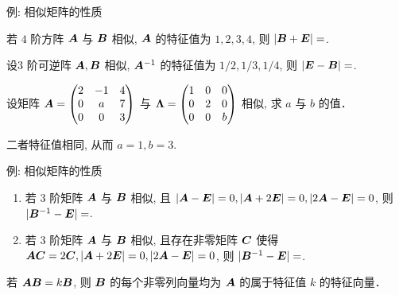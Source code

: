 \begin{frame}{例: 相似矩阵的性质}
	\onslide<+->
	\begin{example}
		若 $4$ 阶方阵 ${\boldsymbol{A}}$ 与 ${\boldsymbol{B}}$ 相似, ${\boldsymbol{A}}$ 的特征值为 $1,2,3,4$, 则 $|{\boldsymbol{B}}+{\boldsymbol{E}}|=$.
	\end{example}
	\onslide<+->
	\begin{example}
		设$3$ 阶可逆阵 ${\boldsymbol{A}},{\boldsymbol{B}}$ 相似, ${\boldsymbol{A}}^{-1}$ 的特征值为 $1/2,1/3,1/4$, 则 $|{\boldsymbol{E}}-{\boldsymbol{B}}|=$\fillblank{\visible<+->{$-6$}}.
	\end{example}
	\onslide<+->
	\begin{example}
		设矩阵 ${\boldsymbol{A}}=\begin{pmatrix}
			2&-1&4\\
			0&a&7\\
			0&0&3
		\end{pmatrix}$ 与 ${\boldsymbol{\Lambda}}=\begin{pmatrix}
			1&0&0\\
			0&2&0\\
			0&0&b
		\end{pmatrix}$ 相似, 求 $a$ 与 $b$ 的值．
	\end{example}
	\onslide<+->
	\begin{solution}
		二者特征值相同, 从而 $a=1,b=3$.
	\end{solution}
\end{frame}


\begin{frame}{例: 相似矩阵的性质}
	\onslide<+->
	\begin{exercise}
		\begin{enumerate}
			\item 若 $3$ 阶矩阵 ${\boldsymbol{A}}$ 与 ${\boldsymbol{B}}$ 相似, 且 $|{\boldsymbol{A}}-{\boldsymbol{E}}|=0, |{\boldsymbol{A}}+2{\boldsymbol{E}}|=0, |2{\boldsymbol{A}}-{\boldsymbol{E}}|=0$, 则 $|{\boldsymbol{B}}^{-1}-{\boldsymbol{E}}|=$\fillblank{\visible<4->{$3/4$}}.
			\item 若 $3$ 阶矩阵 ${\boldsymbol{A}}$ 与 ${\boldsymbol{B}}$ 相似, 且存在非零矩阵 ${\boldsymbol{C}}$ 使得 ${\boldsymbol{A}}{\boldsymbol{C}}=2{\boldsymbol{C}}, |{\boldsymbol{A}}+2{\boldsymbol{E}}|=0, |2{\boldsymbol{A}}-{\boldsymbol{E}}|=0$, 则 $|{\boldsymbol{B}}^{-1}-{\boldsymbol{E}}|=$\fillblank{\visible<5->{$3/4$}}.
		\end{enumerate}
	\end{exercise}
	\onslide<+->
	若 ${\boldsymbol{A}}{\boldsymbol{B}}=k{\boldsymbol{B}}$, 则 ${\boldsymbol{B}}$ 的每个非零列向量均为 ${\boldsymbol{A}}$ 的属于特征值 $k$ 的特征向量．
\end{frame}


